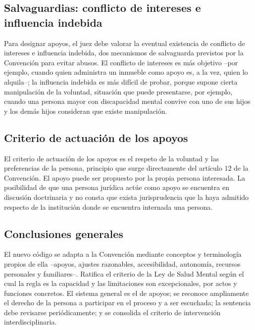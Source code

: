 \documentclass[12pt,oneside]{book}
\begin{document}
\subsection{Salvaguardias: conflicto de intereses e influencia indebida}

Para designar apoyos, el juez debe valorar la eventual existencia de conflicto de intereses e influencia indebida, dos mecanismos de salvaguarda previstos por la Convención para evitar abusos. El conflicto de intereses es más objetivo --por ejemplo, cuando quien administra un inmueble como apoyo es, a la vez, quien lo alquila--; la influencia indebida es más difícil de probar, porque supone cierta manipulación de la voluntad, situación que puede presentarse, por ejemplo, cuando una persona mayor con discapacidad mental convive con uno de sus hijos y los demás hijos consideran que existe manipulación.

\subsection{Criterio de actuación de los apoyos}

El criterio de actuación de los apoyos es el respeto de la voluntad y las preferencias de la persona, principio que surge directamente del artículo 12 de la Convención. El apoyo puede ser propuesto por la propia persona interesada. La posibilidad de que una persona jurídica actúe como apoyo se encuentra en discusión doctrinaria y no consta que exista jurisprudencia que la haya admitido respecto de la institución donde se encuentra internada una persona.


\subsection{Conclusiones generales}

El nuevo código se adapta a la Convención mediante conceptos y terminología propios de ella --apoyos, ajustes razonables, accesibilidad, autonomía, recursos personales y familiares--. Ratifica el criterio de la Ley de Salud Mental según el cual la regla es la capacidad y las limitaciones son excepcionales, por actos y funciones concretos. El sistema general es el de apoyos; se reconoce ampliamente el derecho de la persona a participar en el proceso y a ser escuchada; la sentencia debe revisarse periódicamente; y se consolida el criterio de intervención interdisciplinaria.
\end{document}
